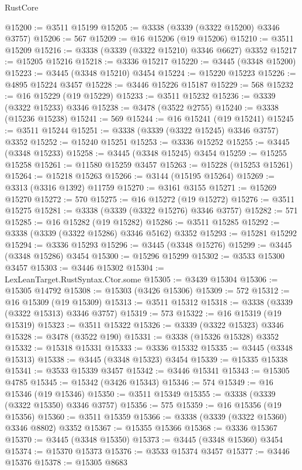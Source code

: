 \begin{lexlean}{RustCore}
\begin{coremodule}
@15200 := @3511 @15199
@15205 := @3338 (@3339 (@3322 @15200) @3346 @3757)
@15206 := 567
@15209 := @16 @15206 (@19 @15206)
@15210 := @3511 @15209
@15216 := @3338 (@3339 (@3322 @15210) @3346 @6627) @3352
@15217 := @15205 @15216
@15218 := @3336 @15217
@15220 := @3445 (@3348 @15200)
@15223 := @3445 (@3348 @15210) @3454
@15224 := @15220 @15223
@15226 := @4895 @15224 @3457
@15228 := @3446 @15226 @15187
@15229 := 568
@15232 := @16 @15229 (@19 @15229)
@15233 := @3511 @15232
@15236 := @3339 (@3322 @15233) @3346
@15238 := @3478 (@3522 @2755)
@15240 := @3338 (@15236 @15238)
@15241 := 569
@15244 := @16 @15241 (@19 @15241)
@15245 := @3511 @15244
@15251 := @3338 (@3339 (@3322 @15245) @3346 @3757) @3352
@15252 := @15240 @15251
@15253 := @3336 @15252
@15255 := @3445 (@3348 @15233)
@15258 := @3445 (@3348 @15245) @3454
@15259 := @15255 @15258
@15261 := @11580 @15259 @3457
@15263 := @15228 (@15253 @15261)
@15264 := @15218 @15263
@15266 := @3144 (@15195 @15264)
@15269 := @3313 (@3316 @1392) @11759
@15270 := @3161 @3155
@15271 := @15269 @15270
@15272 := 570
@15275 := @16 @15272 (@19 @15272)
@15276 := @3511 @15275
@15281 := @3338 (@3339 (@3322 @15276) @3346 @3757)
@15282 := 571
@15285 := @16 @15282 (@19 @15282)
@15286 := @3511 @15285
@15292 := @3338 (@3339 (@3322 @15286) @3346 @5162) @3352
@15293 := @15281 @15292
@15294 := @3336 @15293
@15296 := @3445 (@3348 @15276)
@15299 := @3445 (@3348 @15286) @3454
@15300 := @15296 @15299
@15302 := @3533 @15300 @3457
@15303 := @3446 @15302
@15304 := LexLeanTarget.RustSyntax.Ctor.some
@15305 := @3439 @15304
@15306 := @15305 @14792
@15308 := @15303 (@3426 @15306)
@15309 := 572
@15312 := @16 @15309 (@19 @15309)
@15313 := @3511 @15312
@15318 := @3338 (@3339 (@3322 @15313) @3346 @3757)
@15319 := 573
@15322 := @16 @15319 (@19 @15319)
@15323 := @3511 @15322
@15326 := @3339 (@3322 @15323) @3346
@15328 := @3478 (@3522 @190)
@15331 := @3338 (@15326 @15328) @3352
@15332 := @15318 @15331
@15333 := @3336 @15332
@15335 := @3445 (@3348 @15313)
@15338 := @3445 (@3348 @15323) @3454
@15339 := @15335 @15338
@15341 := @3533 @15339 @3457
@15342 := @3446 @15341
@15343 := @15305 @4785
@15345 := @15342 (@3426 @15343)
@15346 := 574
@15349 := @16 @15346 (@19 @15346)
@15350 := @3511 @15349
@15355 := @3338 (@3339 (@3322 @15350) @3346 @3757)
@15356 := 575
@15359 := @16 @15356 (@19 @15356)
@15360 := @3511 @15359
@15366 := @3338 (@3339 (@3322 @15360) @3346 @8802) @3352
@15367 := @15355 @15366
@15368 := @3336 @15367
@15370 := @3445 (@3348 @15350)
@15373 := @3445 (@3348 @15360) @3454
@15374 := @15370 @15373
@15376 := @3533 @15374 @3457
@15377 := @3446 @15376
@15378 := @15305 @8683

\end{coremodule}
\end{lexlean}
